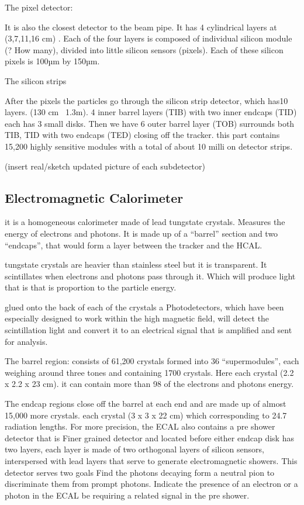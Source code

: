 The pixel detector: 

It is also the closest detector to the beam pipe. It has 4 cylindrical layers at (3,7,11,16 cm) . Each of the four layers is composed of individual silicon module (? How many), divided into little silicon sensors (pixels).  Each of these silicon pixels is 100µm by 150µm.

The silicon strips 

After the pixels the particles go through the silicon strip detector, which has10 layers. (130 cm~ 1.3m). 4 inner barrel layers (TIB) with two inner endcaps (TID) each has 3 small disks. Then we have 6 outer barrel layer (TOB) surrounds both TIB, TID with two endcaps (TED) closing off the tracker. this part contains 15,200 highly sensitive modules with a total of about 10 milli on detector strips.

(insert real/sketch updated picture of each subdetector)


\subsection{Electromagnetic Calorimeter}

it is a homogeneous calorimeter made of lead tungstate crystals. Measures the energy of electrons and photons. It is made up of a “barrel” section and two “endcaps”, that would form a layer between the tracker and the HCAL. 

tungstate crystals are heavier than stainless steel but it is transparent. It scintillates when electrons and photons pass through it. Which will produce light that is that is proportion to the particle energy. 

glued onto the back of each of the crystals a Photodetectors, which have been especially designed to work within the high magnetic field, will detect the scintillation light and convert it to an electrical signal that is amplified and sent for analysis.

The barrel region: consists of 61,200 crystals formed into 36 “supermodules”, each weighing around three tones and containing 1700 crystals. Here each crystal (2.2 x 2.2 x 23 cm). it can contain more than 98 of the electrons and photons energy.

The endcap regions close off the barrel at each end and are made up of almost 15,000 more crystals. each crystal (3 x 3 x 22 cm) which corresponding to 24.7 radiation lengths. For more precision, the ECAL also contains a pre shower detector that is Finer grained detector and located before either endcap disk has two layers, each layer is made of two orthogonal layers of silicon sensors, interspersed with lead layers that serve to generate electromagnetic showers. This detector serves two goals Find the photons decaying form a neutral pion to discriminate them from prompt photons.  Indicate the presence of an electron or a photon in the ECAL be requiring a related signal in the pre shower.


